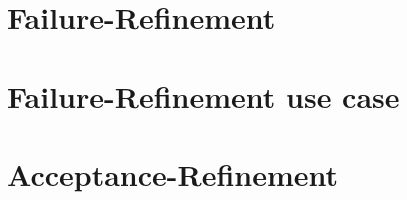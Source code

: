 


\section{Failure-Refinement}
\label{sec_failure-refinement}


\section{Failure-Refinement use case}
\label{sec_failure_refinement_application}


\section{Acceptance-Refinement}
\label{sec_acceptance-refinement}
